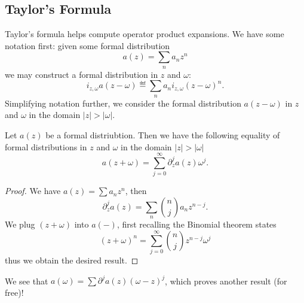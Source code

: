 \subsection{Taylor's Formula}

\M
Taylor's formula helps compute operator product expansions. We have some
notation first: given some formal distribution 
\begin{equation}
a(z)=\sum_{n}a_{n}z^{n}
\end{equation}
we may construct a formal distribution in $z$ and $\omega$:
\begin{equation}
i_{z,\omega}a(z-\omega)\eqdef\sum_{n} a_{n}i_{z,\omega}(z-\omega)^{n}.
\end{equation}
Simplifying notation further, we consider the formal distribution
$a(z-\omega)$ in $z$ and $\omega$ in the domain $|z|>|\omega|$.

\begin{prop}
Let $a(z)$ be a formal distriubtion. Then we have the following equality
of formal distributions in $z$ and $\omega$ in the domain $|z|>|\omega|$
\begin{equation}
a(z+\omega)=\sum^{\infty}_{j=0}\partial_{z}^{j}a(z)\omega^{j}.
\end{equation}
\end{prop}
\begin{proof}
We have $a(z)=\sum a_{n}z^{n}$, then
\begin{equation}
\partial_{z}^{j}a(z)=\sum_{n}{n\choose j}a_{n}z^{n-j}.
\end{equation}
We plug $(z+\omega)$ into $a(-)$, first recalling the Binomial theorem states
\begin{equation}
(z+\omega)^{n}=\sum^{\infty}_{j=0}{n\choose j}z^{n-j}\omega^{j}
\end{equation}
thus we obtain the desired result.
\end{proof}

\begin{rmk}
We see that $a(\omega)=\sum\partial^{j}a(z)(\omega-z)^{j}$, which proves
another result (for free)!
\end{rmk}

